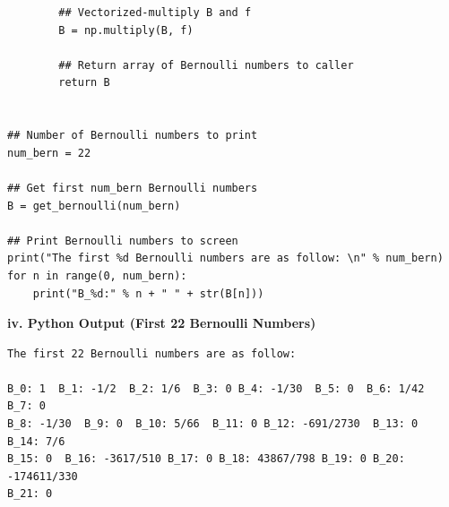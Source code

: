 \documentclass{article}
\begin{document}
\begin{lstlisting}
        ## Vectorized-multiply B and f
        B = np.multiply(B, f)
        
        ## Return array of Bernoulli numbers to caller
        return B
    

## Number of Bernoulli numbers to print
num_bern = 22

## Get first num_bern Bernoulli numbers
B = get_bernoulli(num_bern)

## Print Bernoulli numbers to screen
print("The first %d Bernoulli numbers are as follow: \n" % num_bern)
for n in range(0, num_bern):
    print("B_%d:" % n + " " + str(B[n]))
\end{lstlisting}

\noindent\begin{large}\textbf{iv. Python Output (First 22 Bernoulli Numbers)}\end{large}

\begin{verbatim}
The first 22 Bernoulli numbers are as follow: 

B_0: 1  B_1: -1/2  B_2: 1/6  B_3: 0 B_4: -1/30  B_5: 0  B_6: 1/42  B_7: 0
B_8: -1/30  B_9: 0  B_10: 5/66  B_11: 0 B_12: -691/2730  B_13: 0  B_14: 7/6
B_15: 0  B_16: -3617/510 B_17: 0 B_18: 43867/798 B_19: 0 B_20: -174611/330
B_21: 0
\end{verbatim}
\end{document}
